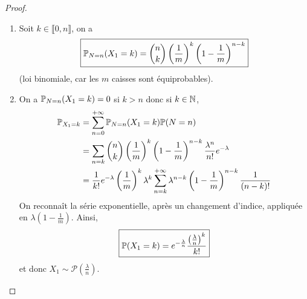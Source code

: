 \documentclass[12pt]{article}
\begin{document}
\begin{proof}
    \phantom{}
    \begin{enumerate}
        \item Soit $k\in\llbracket0,n\rrbracket$, on a 
        \begin{equation}
            \boxed{\P_{N=n}(X_{1}=k)=\binom{n}{k}\left(\frac{1}{m}\right)^{k}\left(1-\frac{1}{m}\right)^{n-k}}
        \end{equation}
        (loi binomiale, car les $m$ caisses sont équiprobables).

        \item On a $\P_{N=n}(X_{1}=k)=0$ si $k>n$ donc si $k\in\N$,
        \begin{align}
            \P_{X_{1}=k}
            &=\sum_{n=0}^{+\infty}\P_{N=n}(X_{1}=k)\P(N=n)\\
            &=\sum_{n=k}\binom{n}{k}\left(\frac{1}{m}\right)^{k}\left(1-\frac{1}{m}\right)^{n-k}\frac{\lambda^{n}}{n!}e^{-\lambda}\\
            &=\frac{1}{k!}e^{-\lambda}\left(\frac{1}{m}\right)^{k}\lambda^{k}\sum_{n=k}^{+\infty}\lambda^{n-k}\left(1-\frac{1}{m}\right)^{n-k}\frac{1}{(n-k)!}
        \end{align}
        On reconnaît la série exponentielle, après un changement d'indice, appliquée en $\lambda\left(1-\frac{1}{m}\right)$. Ainsi,
        \begin{equation}
            \boxed{\P(X_{1}=k)=e^{-\frac{\lambda}{n}}\frac{\left(\frac{\lambda}{n}\right)^{k}}{k!}}
        \end{equation}
        et donc $X_{1}\sim\mathcal{P}\left(\frac{\lambda}{n}\right)$.
    \end{enumerate}
\end{proof}
\end{document}
